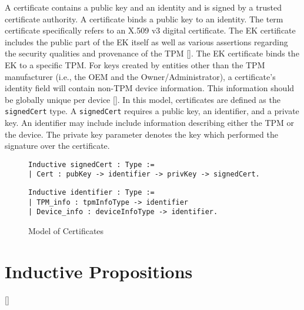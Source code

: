 A certificate contains a public key and an identity and is signed by a trusted certificate authority. A certificate binds a public key to an identity. The term certificate specifically refers to an X.509 v3 digital certificate. 
The EK certificate includes the public part of the EK itself as well as various assertions regarding the security qualities and provenance of the TPM [\cite{EKSpec}]. The EK certificate binds the EK to a specific TPM. For keys created by entities other than the TPM manufacturer (i.e., the OEM and the Owner/Administrator), a certificate's identity field will contain non-TPM device information. This information should be globally unique per device [\cite{DevIDSpec-IEEE}]. In this model, certificates are defined as the \verb|signedCert| type. A \verb|signedCert| requires a public key, an identifier, and a private key. An identifier may include include information describing either the TPM or the device. The private key parameter denotes the key which performed the signature over the certificate.
\begin{figure}[h]
\begin{lstlisting}[language=Coq]
Inductive signedCert : Type :=
| Cert : pubKey -> identifier -> privKey -> signedCert.
\end{lstlisting}

\begin{lstlisting}[language=Coq]
Inductive identifier : Type :=
| TPM_info : tpmInfoType -> identifier
| Device_info : deviceInfoType -> identifier.
\end{lstlisting}
\caption{Model of Certificates}
\end{figure}





\section{Inductive Propositions}


[\cite{LogicalFoundations}]